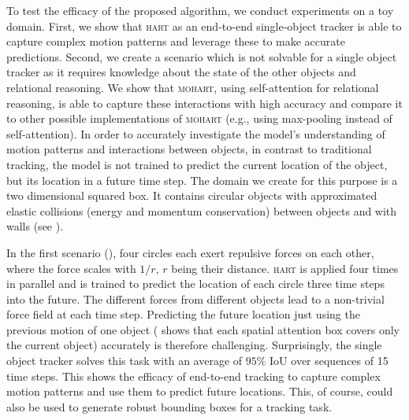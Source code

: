 To test the efficacy of the proposed algorithm, we conduct experiments on a toy domain. First, we show that \textsc{hart} as an end-to-end single-object tracker is able to capture complex motion patterns and leverage these to make accurate predictions. Second, we create a scenario which is not solvable for a single object tracker as it requires knowledge about the state of the other objects and relational reasoning. We show that \textsc{mohart}, using self-attention for relational reasoning, is able to capture these interactions with high accuracy and compare it to other possible implementations of \textsc{mohart} (e.g., using max-pooling instead of self-attention). In order to accurately investigate the model's understanding of motion patterns and interactions between objects, in contrast to traditional tracking, the model is not trained to predict the current location of the object, but its location in a future time step. The domain we create for this purpose is a two dimensional squared box. It contains circular objects with approximated elastic collisions (energy and momentum conservation) between objects and with walls (see ).

In the first scenario (), four circles each exert repulsive forces on each other, where the force scales with $1/r$, $r$ being their distance. \textsc{hart} is applied four times in parallel and is trained to predict the location of each circle three time steps into the future. The different forces from different objects lead to a non-trivial force field at each time step. Predicting the future location just using the previous motion of one object ( shows that each spatial attention box covers only the current object) accurately is therefore challenging. Surprisingly, the single object tracker solves this task with an average of $95\%$ IoU over sequences of 15 time steps. This shows the efficacy of end-to-end tracking to capture complex motion patterns and use them to predict future locations. This, of course, could also be used to generate robust bounding boxes for a tracking task.

